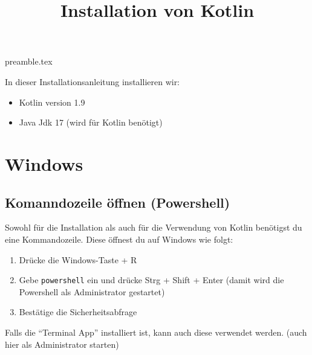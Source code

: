 \RequirePackage{import}
{preamble.tex}
\usepackage{hyperref}
\title{Installation von Kotlin}


\maketitle


In dieser Installationsanleitung installieren wir:
\begin{itemize}
    \item Kotlin version 1.9
    \item Java Jdk 17 (wird für Kotlin benötigt)
\end{itemize}
\section*{Windows}
\subsection*{Komanndozeile öffnen (Powershell)}
Sowohl für die Installation als auch für die Verwendung von Kotlin benötigst du eine Kommandozeile. Diese öffnest du auf Windows wie folgt:
\begin{enumerate}
    \item Drücke die Windows-Taste + R
    \item Gebe \texttt{powershell} ein und drücke Strg + Shift + Enter (damit wird die Powershell als Administrator gestartet)
    \item Bestätige die Sicherheitsabfrage
\end{enumerate}
\begin{hinweis}
    Falls die \enquote{Terminal App} installiert ist, kann auch diese verwendet werden. (auch hier als Administrator starten)
\end{hinweis}
